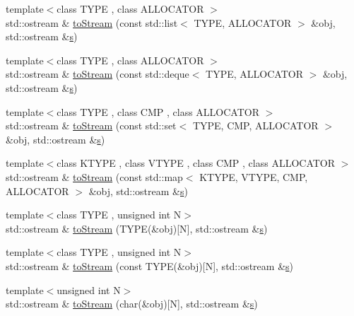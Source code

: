 \begin{DoxyCompactItemize}
\item 
{\footnotesize template$<$class T\+Y\+PE , class A\+L\+L\+O\+C\+A\+T\+OR $>$ }\\std\+::ostream \& \hyperlink{namespace_d_d4hep_1_1_utils_aaa747cec6fddff24617f88f07fe5240f}{to\+Stream} (const std\+::list$<$ T\+Y\+PE, A\+L\+L\+O\+C\+A\+T\+OR $>$ \&obj, std\+::ostream \&\hyperlink{_volumes_8cpp_a17ca6bfc8040d695d3cada22a4763d40}{s})
\item 
{\footnotesize template$<$class T\+Y\+PE , class A\+L\+L\+O\+C\+A\+T\+OR $>$ }\\std\+::ostream \& \hyperlink{namespace_d_d4hep_1_1_utils_aae9b1d676de789590541461e5187810d}{to\+Stream} (const std\+::deque$<$ T\+Y\+PE, A\+L\+L\+O\+C\+A\+T\+OR $>$ \&obj, std\+::ostream \&\hyperlink{_volumes_8cpp_a17ca6bfc8040d695d3cada22a4763d40}{s})
\item 
{\footnotesize template$<$class T\+Y\+PE , class C\+MP , class A\+L\+L\+O\+C\+A\+T\+OR $>$ }\\std\+::ostream \& \hyperlink{namespace_d_d4hep_1_1_utils_afaa532b1449559b0d94fc5ea4ff89e0f}{to\+Stream} (const std\+::set$<$ T\+Y\+PE, C\+MP, A\+L\+L\+O\+C\+A\+T\+OR $>$ \&obj, std\+::ostream \&\hyperlink{_volumes_8cpp_a17ca6bfc8040d695d3cada22a4763d40}{s})
\item 
{\footnotesize template$<$class K\+T\+Y\+PE , class V\+T\+Y\+PE , class C\+MP , class A\+L\+L\+O\+C\+A\+T\+OR $>$ }\\std\+::ostream \& \hyperlink{namespace_d_d4hep_1_1_utils_afe5b1089a2b4c65f34fc789456ad2fa7}{to\+Stream} (const std\+::map$<$ K\+T\+Y\+PE, V\+T\+Y\+PE, C\+MP, A\+L\+L\+O\+C\+A\+T\+OR $>$ \&obj, std\+::ostream \&\hyperlink{_volumes_8cpp_a17ca6bfc8040d695d3cada22a4763d40}{s})
\item 
{\footnotesize template$<$class T\+Y\+PE , unsigned int N$>$ }\\std\+::ostream \& \hyperlink{namespace_d_d4hep_1_1_utils_a12b3cc30e429682af25ebf60c4527ce2}{to\+Stream} (T\+Y\+PE(\&obj)\mbox{[}N\mbox{]}, std\+::ostream \&\hyperlink{_volumes_8cpp_a17ca6bfc8040d695d3cada22a4763d40}{s})
\item 
{\footnotesize template$<$class T\+Y\+PE , unsigned int N$>$ }\\std\+::ostream \& \hyperlink{namespace_d_d4hep_1_1_utils_a6fd757ad84b1cf53481c6c4bd48f26c0}{to\+Stream} (const T\+Y\+PE(\&obj)\mbox{[}N\mbox{]}, std\+::ostream \&\hyperlink{_volumes_8cpp_a17ca6bfc8040d695d3cada22a4763d40}{s})
\item 
{\footnotesize template$<$unsigned int N$>$ }\\std\+::ostream \& \hyperlink{namespace_d_d4hep_1_1_utils_ae93240ec7d2befb47d6bd09e1d318380}{to\+Stream} (char(\&obj)\mbox{[}N\mbox{]}, std\+::ostream \&\hyperlink{_volumes_8cpp_a17ca6bfc8040d695d3cada22a4763d40}{s})

\end{DoxyCompactItemize}
